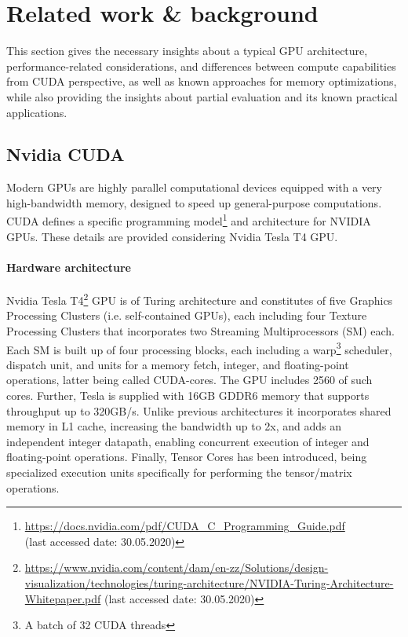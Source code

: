\section{Related work \& background}
This section gives the necessary insights about a typical GPU architecture, performance-related considerations, and differences between compute capabilities from CUDA perspective, as well as known approaches for memory optimizations, while also providing the insights about partial evaluation and its known practical applications.
\subsection{Nvidia CUDA}
Modern GPUs are highly parallel computational devices equipped with a very high-bandwidth memory, designed to speed up general-purpose computations. CUDA defines a specific programming model\footnote{\url{https://docs.nvidia.com/pdf/CUDA_C_Programming_Guide.pdf} \\ (last accessed date: 30.05.2020)} and architecture for NVIDIA GPUs. These details are provided considering Nvidia Tesla T4 GPU.
\paragraph*{Hardware architecture}
Nvidia Tesla T4\footnote{\url{https://www.nvidia.com/content/dam/en-zz/Solutions/design-visualization/technologies/turing-architecture/NVIDIA-Turing-Architecture-Whitepaper.pdf} (last accessed date: 30.05.2020)} GPU is of Turing architecture and constitutes of five Graphics Processing Clusters (i.e. self-contained GPUs), each including four Texture Processing Clusters that incorporates two Streaming Multiprocessors (SM) each. Each SM is built up of four processing blocks, each including a warp\footnote{A batch of 32 CUDA threads} scheduler, dispatch unit, and units for a memory fetch, integer, and floating-point operations, latter being called CUDA-cores. The GPU includes 2560 of such cores. Further, Tesla is supplied with 16GB GDDR6 memory that supports throughput up to 320GB/s. Unlike previous architectures it incorporates shared memory in L1 cache, increasing the bandwidth up to 2x, and adds an independent integer datapath, enabling concurrent execution of integer and floating-point operations. Finally, Tensor Cores has been introduced, being specialized execution units specifically for performing the tensor/matrix operations.

